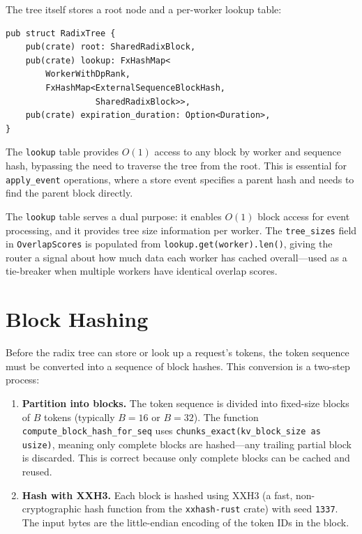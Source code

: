 The tree itself stores a root node and a per-worker lookup table:

\begin{verbatim}
pub struct RadixTree {
    pub(crate) root: SharedRadixBlock,
    pub(crate) lookup: FxHashMap<
        WorkerWithDpRank,
        FxHashMap<ExternalSequenceBlockHash,
                  SharedRadixBlock>>,
    pub(crate) expiration_duration: Option<Duration>,
}
\end{verbatim}

%
The \texttt{lookup} table provides $O(1)$ access to any block by worker and sequence hash, bypassing the need to traverse the tree from the root. This is essential for \texttt{apply\_event} operations, where a store event specifies a parent hash and needs to find the parent block directly.

\begin{notebox}
The \texttt{lookup} table serves a dual purpose: it enables $O(1)$ block access for event processing, and it provides tree size information per worker. The \texttt{tree\_sizes} field in \texttt{OverlapScores} is populated from \texttt{lookup.get(worker).len()}, giving the router a signal about how much data each worker has cached overall---used as a tie-breaker when multiple workers have identical overlap scores.
\end{notebox}

\section{Block Hashing}
\label{sec:kvrouter:hashing}

Before the radix tree can store or look up a request's tokens, the token sequence must be converted into a sequence of block hashes. This conversion is a two-step process:

\begin{enumerate}
  \item \textbf{Partition into blocks.} The token sequence is divided into fixed-size blocks of $B$ tokens (typically $B = 16$ or $B = 32$). The function \texttt{compute\_block\_hash\_for\_seq} uses \texttt{chunks\_exact(kv\_block\_size as usize)}, meaning only complete blocks are hashed---any trailing partial block is discarded. This is correct because only complete blocks can be cached and reused.
  \item \textbf{Hash with XXH3.} Each block is hashed using XXH3 (a fast, non-cryptographic hash function from the \texttt{xxhash-rust} crate) with seed \texttt{1337}. The input bytes are the little-endian encoding of the token IDs in the block.
\end{enumerate}

